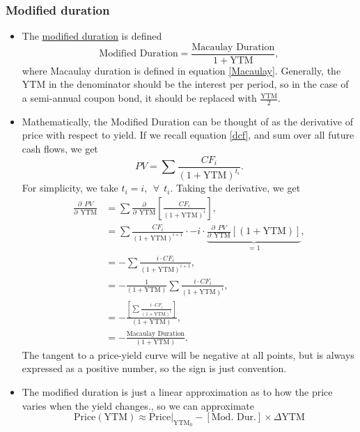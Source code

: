\documentclass[../notes_compiled.tex]{subfiles}
\begin{document}
\subsubsection{Modified duration}
\begin{itemize}
\item The \underline{modified duration} is defined
\begin{equation}
\text{Modified Duration} = \frac{\text{Macaulay Duration}}{1 + \text{YTM}}, \label{mod-dur}
\end{equation}
where Macaulay duration is defined in equation \ref{Macaulay}. Generally, the YTM in the denominator should be the interest per period, so in the case of a semi-annual coupon bond, it should be replaced with $\frac{\text{YTM}}{2}$.
\item Mathematically, the Modified Duration can be thought of as the derivative of price with respect to yield. If we recall equation \ref{dcf}, and sum over all future cash flows, we get
\begin{equation}
PV = \sum\frac{CF_{i}}{(1+\text{YTM})^{t_{i}}}.
\end{equation}
For simplicity, we take $t_i = i, \phantom{,}\forall\phantom{,} t_{i}$. Taking the derivative, we get
\begin{align}
\frac{\partial \phantom{,}PV}{\partial \phantom{,}\text{YTM}} &= \sum\frac{\partial}{\partial \phantom{,}\text{YTM}}\left[\frac{CF_{i}}{(1+\text{YTM})^{i}}\right], \label{deriv-dur}\\
&= \sum\frac{CF_{i}}{(1+\text{YTM})^{i+1}}\cdot-i\cdot\underbrace{\frac{\partial \phantom{,}PV}{\partial \phantom{,}\text{YTM}}\left[(1+\text{YTM})\right]}_{=1}, \nonumber \\
&=- \sum\frac{i\cdot CF_{i}}{(1+\text{YTM})^{i+1}}, \nonumber \\
&=- \frac{1}{(1+\text{YTM})}\sum\frac{i\cdot CF_{i}}{(1+\text{YTM})^{i}}, \nonumber \\
&=- \frac{\left[\sum\frac{i\cdot CF_{i}}{(1+\text{YTM})^{i}}\right]}{(1+\text{YTM})}, \nonumber \\
&=-\frac{\text{Macaulay Duration}}{(1 + \text{YTM})}. \nonumber
\end{align}
The tangent to a price-yield curve will be negative at all points, but is always expressed as a positive number, so the sign is just convention.
\item The modified duration is just a linear approximation as to how the price varies when the yield changes., so we can approximate
\begin{equation}
\text{Price}(\text{YTM}) \approx \text{Price}|_{\text{YTM}_{0}} - [\text{Mod. Dur.}] \times \Delta \text{YTM} \label{taylor-one}
\end{equation}


\end{itemize}
\end{document}
